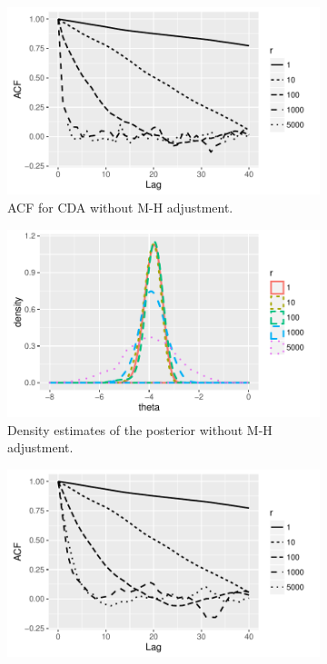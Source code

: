 \documentclass[10pt]{article}
\begin{document}
\begin{figure}[H]
  \begin{subfigure}[b]{0.32\textwidth}
 \includegraphics[width=1\textwidth]{probit_demo_acf_prop.pdf}
  \caption{ACF for CDA without M-H adjustment.}
 \label{probit_demo_intercept_proposal}
\end{subfigure}
  \hfill
    \begin{subfigure}[b]{0.32\textwidth}
 \includegraphics[width=1\textwidth]{density_probit.pdf}
  \caption{Density estimates of the posterior without M-H adjustment.}
   \label{probit_demo_intercept_density}
\end{subfigure}
\hfill
   \begin{subfigure}[b]{0.32\textwidth}
 \includegraphics[width=1\textwidth]{probit_demo_acf.pdf}

\end{subfigure}
\end{figure}
\end{document}
